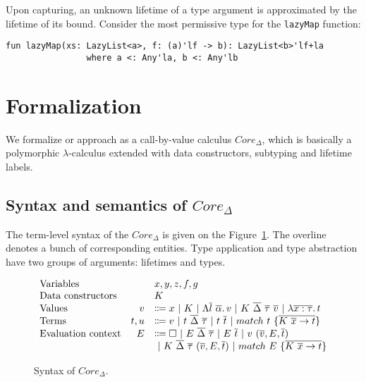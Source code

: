 \documentclass[11pt]{article}
\newcommand{\vor}{~|~}
\newcommand{\ap}{~}
\begin{document}
    Upon capturing, an unknown lifetime of a type argument is approximated by the lifetime of its bound.
    Consider the most permissive type for the \lstinline[language=colang]|lazyMap| function:
    \begin{lstlisting}[language=colang]
        fun lazyMap(xs: LazyList<a>, f: (a)'lf -> b): LazyList<b>'lf+la
                where a <: Any'la, b <: Any'lb
    \end{lstlisting}


    \section{Formalization}

    We formalize or approach as a call-by-value calculus $Core_{\Delta}$, which is basically a polymorphic $\lambda$-calculus extended with data constructors, subtyping and lifetime labels.

    \subsection{Syntax and semantics of $Core_\Delta$}

    The term-level syntax of the $Core_\Delta$ is given on the Figure~\ref{fig:core-syntax}.
    The overline denotes a bunch of corresponding entities.
    Type application and type abstraction have two groups of arguments: lifetimes and types.

    \begin{figure}
        \centering
        \[
            \begin{array}{lrl}
                \text{Variables}          &   & x, y, z, f, g                                                                                                                          \\
                \text{Data constructors}  &   & K                                                                                                                                      \\
                \text{Values} & v & \Coloneqq x \vor K \vor \Lambda \overline{l}~\overline{\alpha} \ldotp v \vor K\ap\overline{\Delta}\ap \overline{\tau} \ap \overline{v} \vor \lambda \overline{x : \tau}\ldotp t
                \\
                \text{Terms} & t, u & \Coloneqq v \vor t\ap\overline{\Delta}\ap\overline{\tau} \vor t\ap \overline{t} \vor match ~ t ~\{\overline{K \ap \overline{x} \to t}\}
                \\
                \text{Evaluation context} & E & \Coloneqq \square \vor E \ap\overline{\Delta}\ap \overline{\tau} \vor E \ap \overline{t} \vor v \ap (\overline{v}, E, \overline{t})    \\
                &   & \vor K\ap\overline{\Delta}\ap\overline{\tau}\ap(\overline{v}, E, \overline{t}) \vor match\ap E\ap \{\overline{K\ap\overline{x}\to t}\}
            \end{array}
        \]
        \caption{Syntax of $Core_\Delta$.}
        \label{fig:core-syntax}
    \end{figure}
\end{document}
